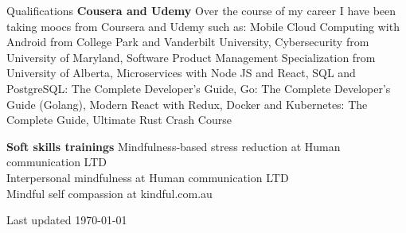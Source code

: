 \documentclass{resume}
\begin{document}
\begin{rSection}{Qualifications}
    {\bf Cousera and Udemy}
    Over the course of my career I have been taking moocs from Coursera and Udemy such as:
    Mobile Cloud Computing with Android from College Park and Vanderbilt University,
    Cybersecurity from University of Maryland,
    Software Product Management Specialization from University of Alberta, 
    Microservices with Node JS and React,
    SQL and PostgreSQL: The Complete Developer's Guide,
    Go: The Complete Developer's Guide (Golang),
    Modern React with Redux,
    Docker and Kubernetes: The Complete Guide,
    Ultimate Rust Crash Course	
    
   {\bf Soft skills trainings}
    Mindfulness-based stress reduction at Human communication LTD\\
    Interpersonal mindfulness at Human communication LTD\\
    Mindful self compassion at kindful.com.au\\
  \end{rSection}


  \begin{rSection}{}
    Last updated \today 
  \end{rSection}
\end{document}
